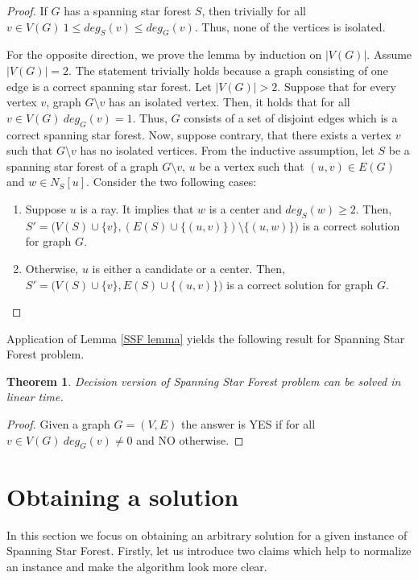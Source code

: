\documentclass[en]{pracamgr}
\newtheorem{theorem}{Theorem}
\newcommand{\SSF}{Spanning Star Forest}
\newcommand{\ssf}{spanning star forest}
\begin{document}
\begin{proof}
	If $G$ has a \ssf{} $S$, then trivially for all $v \in V(G)\ 1 \leq deg_S(v) \leq deg_G(v)$. Thus, none of the vertices is isolated.
	
	For the opposite direction, we prove the lemma by induction on $|V(G)|$. Assume $|V(G)|=2$. The statement trivially holds because a graph consisting of one edge is a correct \ssf{}. Let $|V(G)| >2$. Suppose that for every vertex $v$, graph $G \setminus v$ has an isolated vertex. Then, it holds that for all $v \in V(G)\ deg_G(v)=1$. Thus, $G$ consists of a set of disjoint edges which is a correct \ssf{}. Now, suppose contrary, that there exists a vertex $v$ such that $G \setminus v$ has no isolated vertices. From the inductive assumption, let $S$ be a \ssf{} of a graph $G \setminus v$, $u$ be a vertex such that $(u,v) \in E(G)$ and $w \in N_S[u]$. Consider the two following cases:
	\begin{enumerate}
		\item Suppose $u$ is a ray. It implies that $w$ is a center and $deg_S(w) \geq 2$. Then, $S'=\big(V(S) \cup \{v\},(E(S) \cup \{(u,v)\}) \setminus \{(u,w)\}\big)$ is a correct solution for graph $G$.
		\item Otherwise, $u$ is either a candidate or a center. Then, $S'=\big(V(S) \cup \{v\}, E(S) \cup \{(u,v)\}\big)$ is a correct solution for graph $G$.
	\end{enumerate}
	
\end{proof}
	Application of Lemma \ref{SSF lemma} yields the following result for {\sc \SSF{}} problem.

\begin{theorem}
	Decision version of {\sc \SSF{}} problem can be solved in linear time.
\end{theorem}

\begin{proof}
	Given a graph $G = (V,E)$ the answer is YES if for all $v \in V(G)\ deg_G(v) \neq 0$ and NO otherwise.
\end{proof}

\section{Obtaining a solution}

In this section we focus on obtaining an arbitrary solution for a given instance of {\sc \SSF{}}. Firstly, let us introduce two claims which help to normalize an instance and make the algorithm look more clear.
\end{document}
